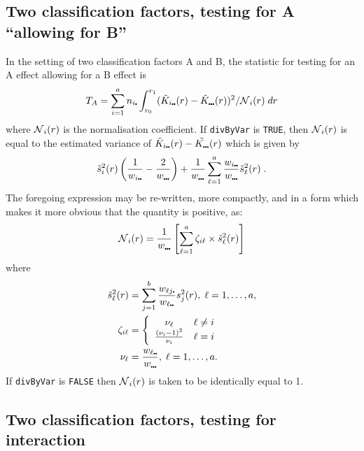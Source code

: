 \documentclass[12pt]{article}
\newcommand{\pt}{\mbox{\scalebox{0.4}{$\bullet$}}}
\newcommand{\tils}{\mbox{$\tilde{s}$}}
\newcommand{\sco}{\mbox{$\cal N$}}
\begin{document}
\subsection{Two classification factors, testing for A ``allowing for B''}
\label{sec:teststats.testForA}
In the setting of two classification factors A and B, the statistic
for testing for an A effect allowing for a B effect is
\[
T_A = \sum_{i=1}^a n_{i \pt} \int_{r_0}^{r_1} (\tilde{K}_{i \pt \pt}(r) -
                 \tilde{K}_{\pt \pt \pt}(r))^2/\sco_i(r) \; dr
\]
where $\sco_i(r)$ is the normalisation coefficient.  If
\texttt{divByVar} is \texttt{TRUE}, then $\sco_i(r)$ is equal
to the estimated variance of $\tilde{K}_{i \pt \pt}(r) - \tilde{K_{\pt \pt \pt}}(r)$
which is given by
\[
\tils_i^2(r) \left ( \frac{1}{w_{i \pt \pt}} - \frac{2}{w_{\pt \pt \pt}}
                      \right ) + \frac{1}{w_{\pt \pt \pt}} \sum_{\ell=1}^a
                      \frac{w_{i \pt \pt}}{w_{\pt \pt \pt}} \tils_{\ell}^2(r) \; .
\]
The foregoing expression may be re-written, more compactly, and in a form which
makes it more obvious that the quantity is positive, as:
\[
\sco_i(r) = \frac{1}{w_{\pt \pt \pt}} \left [
            \sum_{\ell=1}^a \zeta_{i \ell} \times \tils^2_{\ell}(r) \right ]
\]
where
\begin{align*}
\tils^2_{\ell}(r) &= \sum_{j=1}^b \frac{w_{\ell j\pt}}{w_{\ell \pt \pt}} s_j^2(r),
\; \ell = 1, \ldots, a, \\
\zeta_{i \ell} &= \left \{ \begin{array}{cl}
               \nu_{\ell} & \ell \neq i \\
               \frac{(\nu_i - 1)^2}{\nu_i} & \ell = i 
               \end{array} \right . \\
\nu_{\ell} &= \frac{w_{\ell \pt \pt}}{w_{\pt \pt \pt}}, \;
\ell = 1, \ldots, a.
\end{align*}
If \texttt{divByVar} is \texttt{FALSE} then $\sco_i(r)$ is taken to
be identically equal to 1.

\subsection{Two classification factors, testing for interaction}
\label{sec:teststats.testForInterac}
\end{document}
